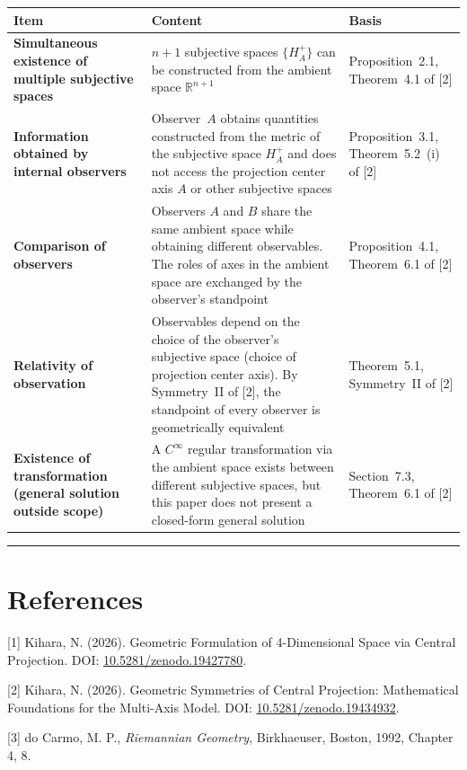 \documentclass[a4paper,11pt]{article}
\theoremstyle{definition}
\begin{document}
\begin{longtable}{p{4cm}p{7.5cm}p{3.5cm}}
\toprule
Item & Content & Basis \\
\midrule
\endhead
\textbf{Simultaneous existence of multiple subjective spaces} & \(n+1\) subjective spaces \(\{H_A^+\}\) can be constructed from the ambient space \(\mathbb{R}^{n+1}\) & Proposition~2.1, Theorem~4.1 of {[2]} \\
\addlinespace
\textbf{Information obtained by internal observers} & Observer~\(A\) obtains quantities constructed from the metric of the subjective space \(H_A^+\) and does not access the projection center axis \(A\) or other subjective spaces & Proposition~3.1, Theorem~5.2~(i) of {[2]} \\
\addlinespace
\textbf{Comparison of observers} & Observers \(A\) and \(B\) share the same ambient space while obtaining different observables. The roles of axes in the ambient space are exchanged by the observer's standpoint & Proposition~4.1, Theorem~6.1 of {[2]} \\
\addlinespace
\textbf{Relativity of observation} & Observables depend on the choice of the observer's subjective space (choice of projection center axis). By Symmetry~II of {[2]}, the standpoint of every observer is geometrically equivalent & Theorem~5.1, Symmetry~II of {[2]} \\
\addlinespace
\textbf{Existence of transformation (general solution outside scope)} & A \(C^\infty\) regular transformation via the ambient space exists between different subjective spaces, but this paper does not present a closed-form general solution & Section~7.3, Theorem~6.1 of {[2]} \\
\bottomrule
\end{longtable}

\bigskip\hrule\bigskip

\section*{References}

\noindent
{[1]} Kihara, N. (2026). Geometric Formulation of 4-Dimensional Space via Central Projection. DOI: \href{https://doi.org/10.5281/zenodo.19427780}{10.5281/zenodo.19427780}.

\noindent
{[2]} Kihara, N. (2026). Geometric Symmetries of Central Projection: Mathematical Foundations for the Multi-Axis Model. DOI: \href{https://doi.org/10.5281/zenodo.19434932}{10.5281/zenodo.19434932}.

\noindent
{[3]} do Carmo, M. P., \textit{Riemannian Geometry}, Birkhaeuser, Boston, 1992, Chapter 4, 8.
\end{document}
